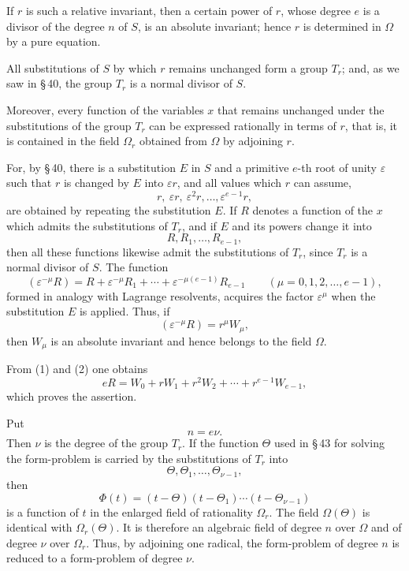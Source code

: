 \documentclass[11pt]{article}
\providecommand{\eps}{\varepsilon}
\providecommand{\eps}{\varepsilon}
\begin{document}
If $r$ is such a relative invariant, then a certain power of $r$, whose degree $e$ is a divisor of the degree $n$ of $S$, is an absolute invariant; hence $r$ is determined in $\Omega$ by a pure equation.

All substitutions of $S$ by which $r$ remains unchanged form a group $T_r$; and, as we saw in \S\,40, the group $T_r$ is a normal divisor of $S$.

Moreover, every function of the variables $x$ that remains unchanged under the substitutions of the group $T_r$ can be expressed rationally in terms of $r$, that is, it is contained in the field $\Omega_r$ obtained from $\Omega$ by adjoining $r$.

For, by \S\,40, there is a substitution $E$ in $S$ and a primitive $e$-th root of unity $\eps$ such that $r$ is changed by $E$ into $\eps r$, and all values which $r$ can assume,
\[
 r,\ \eps r,\ \eps^2r,\ldots,\eps^{e-1}r,
\]
are obtained by repeating the substitution $E$. If $R$ denotes a function of the $x$ which admits the substitutions of $T_r$, and if $E$ and its powers change it into
\[
 R,R_1,\ldots,R_{e-1},
\]
then all these functions likewise admit the substitutions of $T_r$, since $T_r$ is a normal divisor of $S$. The function
\begin{equation}
(\eps^{-\mu}R)=R+\eps^{-\mu}R_1+\cdots+\eps^{-\mu(e-1)}R_{e-1}\qquad(\mu=0,1,2,\ldots,e-1),
\tag{1}
\end{equation}
formed in analogy with Lagrange resolvents, acquires the factor $\eps^\mu$ when the substitution $E$ is applied. Thus, if
\begin{equation}
(\eps^{-\mu}R)=r^\mu W_\mu,
\tag{2}
\end{equation}
then $W_\mu$ is an absolute invariant and hence belongs to the field $\Omega$.

From (1) and (2) one obtains
\begin{equation}
eR=W_0+rW_1+r^2W_2+\cdots+r^{e-1}W_{e-1},
\tag{3}
\end{equation}
which proves the assertion.

Put
\begin{equation}
n=e\nu.
\tag{4}
\end{equation}
Then $\nu$ is the degree of the group $T_r$. If the function $\Theta$ used in \S\,43 for solving the form-problem is carried by the substitutions of $T_r$ into
\[
\Theta,\Theta_1,\ldots,\Theta_{\nu-1},
\]
then
\[
\Phi(t)=(t-\Theta)(t-\Theta_1)\cdots(t-\Theta_{\nu-1})
\]
is a function of $t$ in the enlarged field of rationality $\Omega_r$. The field $\Omega(\Theta)$ is identical with $\Omega_r(\Theta)$. It is therefore an algebraic field of degree $n$ over $\Omega$ and of degree $\nu$ over $\Omega_r$. Thus, by adjoining one radical, the form-problem of degree $n$ is reduced to a form-problem of degree $\nu$.
\end{document}
